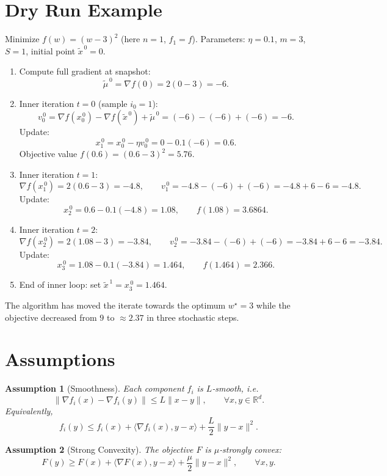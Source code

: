 \documentclass{article}
\newtheorem{assumption}{Assumption}[section]
\begin{document}
\section*{Dry Run Example}
Minimize $f(w)=(w-3)^2$ (here $n=1$, $f_1=f$).  
Parameters: $\eta=0.1$, $m=3$, $S=1$, initial point $\tilde{x}^{\,0}=0$.

\begin{enumerate}[label=Step \arabic*:, leftmargin=*]
\item Compute full gradient at snapshot:
\[
\tilde{\mu}^{\,0}= \nabla f(0)=2(0-3)=-6.
\]

\item Inner iteration $t=0$ (sample $i_0=1$):
\[
v_0^{\,0}= \nabla f(x_{0}^{\,0})-\nabla f(\tilde{x}^{\,0})+\tilde{\mu}^{\,0}
           =(-6)-(-6)+(-6)=-6.
\]
Update:
\[
x_{1}^{\,0}=x_{0}^{\,0}-\eta v_0^{\,0}=0-0.1(-6)=0.6.
\]
Objective value $f(0.6)=(0.6-3)^2=5.76$.

\item Inner iteration $t=1$:
\[
\nabla f(x_{1}^{\,0})=2(0.6-3)=-4.8,\qquad
v_1^{\,0}= -4.8-(-6)+(-6)=-4.8+6-6=-4.8.
\]
Update:
\[
x_{2}^{\,0}=0.6-0.1(-4.8)=1.08,\qquad f(1.08)=3.6864.
\]

\item Inner iteration $t=2$:
\[
\nabla f(x_{2}^{\,0})=2(1.08-3)=-3.84,\qquad
v_2^{\,0}= -3.84-(-6)+(-6)=-3.84+6-6=-3.84.
\]
Update:
\[
x_{3}^{\,0}=1.08-0.1(-3.84)=1.464,\qquad f(1.464)=2.366.
\]

\item End of inner loop: set $\tilde{x}^{\,1}=x_{3}^{\,0}=1.464$.
\end{enumerate}
The algorithm has moved the iterate towards the optimum $w^\star=3$ while the objective decreased from $9$ to $\approx2.37$ in three stochastic steps.

\newpage
\section*{Assumptions}
\begin{assumption}[Smoothness]\label{ass:smooth}
Each component $f_i$ is $L$‑smooth, i.e.
\[
\|\nabla f_i(x)-\nabla f_i(y)\|\le L\|x-y\|,\qquad\forall x,y\in\mathbb{R}^d .
\]
Equivalently,
\[
f_i(y)\le f_i(x)+\langle\nabla f_i(x),y-x\rangle+\frac{L}{2}\|y-x\|^2 .
\]
\end{assumption}

\begin{assumption}[Strong Convexity]\label{ass:strong}
The objective $F$ is $\mu$‑strongly convex:
\[
F(y)\ge F(x)+\langle\nabla F(x),y-x\rangle+\frac{\mu}{2}\|y-x\|^2,\qquad\forall x,y .
\]
\end{assumption}
\end{document}
